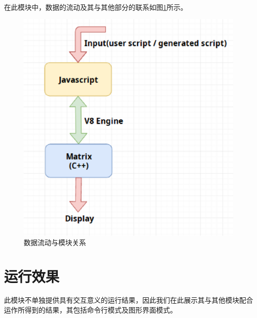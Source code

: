 \documentclass[a4paper,11pt,fontset=fandol]{article}
\begin{document}
在此模块中，数据的流动及其与其他部分的联系如图\ref{1.2}所示。
\begin{figure}[H]
  \centering
  \includegraphics[scale=0.5]{fig//structure.eps}
  \caption{数据流动与模块关系}
  \label{1.2}
\end{figure}

\section{运行效果}
此模块不单独提供具有交互意义的运行结果，因此我们在此展示其与其他模块配合运作所得到的结果，其包括命令行模式及图形界面模式。
\end{document}
